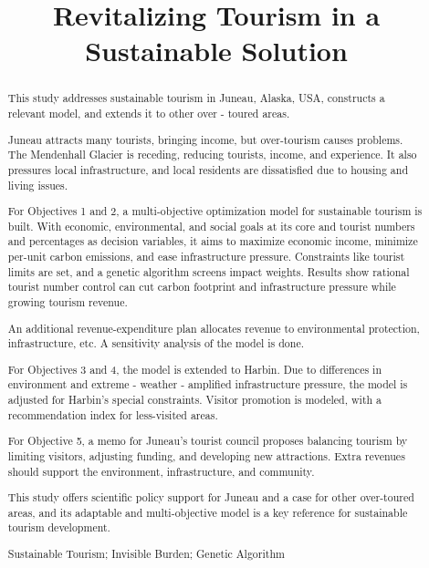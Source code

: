 \documentclass{mcmthesis}
\title{Revitalizing Tourism in a Sustainable Solution}
\begin{document}
\begin{abstract}
  {This study addresses sustainable tourism in Juneau, Alaska, USA, constructs a relevant model, and extends it to other over - toured areas.}

  {Juneau attracts many tourists, bringing income, but over-tourism causes problems. The Mendenhall Glacier is receding, reducing tourists, income, and experience. It also pressures local infrastructure, and local residents are dissatisfied due to housing and living issues.}

  {For Objectives 1 and 2, a multi-objective optimization model for sustainable tourism is built. With economic, environmental, and social goals at its core and tourist numbers and percentages as decision variables, it aims to maximize economic income, minimize per-unit carbon emissions, and ease infrastructure pressure. Constraints like tourist limits are set, and a genetic algorithm screens impact weights. Results show rational tourist number control can cut carbon footprint and infrastructure pressure while growing tourism revenue.}

  {An additional revenue-expenditure plan allocates revenue to environmental protection, infrastructure, etc. A sensitivity analysis of the model is done.}

  {For Objectives 3 and 4, the model is extended to Harbin. Due to differences in environment and extreme - weather - amplified infrastructure pressure, the model is adjusted for Harbin's special constraints. Visitor promotion is modeled, with a recommendation index for less-visited areas.}

  {For Objective 5, a memo for Juneau's tourist council proposes balancing tourism by limiting visitors, adjusting funding, and developing new attractions. Extra revenues should support the environment, infrastructure, and community.}

  {This study offers scientific policy support for Juneau and a case for other over-toured areas, and its adaptable and multi-objective model is a key reference for sustainable tourism development.}
  \begin{keywords}
    Sustainable Tourism; Invisible Burden; Genetic Algorithm
  \end{keywords}
\end{abstract}

\maketitle
\tableofcontents
\newpage
\end{document}

